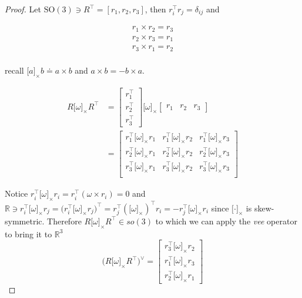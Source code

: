 \documentclass[letter,10pt]{article}
\newcommand{\SO}[1]{ \mathrm{SO(#1)} }
\newcommand{\real}{\mathbb{R}}
\newcommand{\asym}[1]{{\lbrack #1\rbrack}_\times{}}
\begin{document}
\begin{proof}
Let $\SO{3} \ni R^\top=[r_1, r_2, r_3]$, then $r_i^\top r_j=\delta_{ij}$ and 

\begin{equation}
\begin{aligned}
r_1 \times r_2=r_3\\
r_2 \times r_3=r_1\\
r_3 \times r_1=r_2\\
\end{aligned}
\label{eq-basis}
\end{equation}

recall $\asym{a} b\doteq a\times b$ and $a\times b = -b\times a$.

\begin{equation}
\begin{aligned}
R\asym{\omega}R^\top
&=
\begin{bmatrix}
r_1^\top\\
r_2^\top\\
r_3^\top
\end{bmatrix}
\asym{\omega}
\begin{bmatrix}
r_1 & r_2 & r_3
\end{bmatrix}\\
&=
\begin{bmatrix}
r_1^\top \asym{\omega}r_1 & r_1^\top \asym{\omega}r_2 & r_1^\top\asym{\omega} r_3 \\
r_2^\top \asym{\omega}r_1 & r_2^\top \asym{\omega}r_2 & r_2^\top\asym{\omega} r_3 \\
r_3^\top \asym{\omega}r_1 & r_3^\top \asym{\omega}r_2 & r_3^\top\asym{\omega} r_3 \\
\end{bmatrix}
\end{aligned}
\end{equation}

Notice $r_i^\top\asym\omega r_i=r_i^\top (\omega \times r_i)=0$ and $\real\ni r_i^\top \asym\omega r_j=\big( r_i^\top \asym\omega r_j \big)^\top=r_j^\top (\asym\omega)^\top r_i=-r_j^\top\asym\omega r_i$ since $\asym\cdot$ is skew-symmetric. Therefore  $R\asym\omega R^\top \in so(3)$ to which we can apply the \textit{vee} operator to bring it to $\real^3$
\begin{equation}
\big(R\asym{\omega}R^\top\big)^\vee
=
\begin{bmatrix}
r_3^\top\asym\omega r_2\\
r_1^\top\asym\omega r_3\\
r_2^\top\asym\omega r_1
\end{bmatrix}
\end{equation}


\end{proof}
\end{document}
